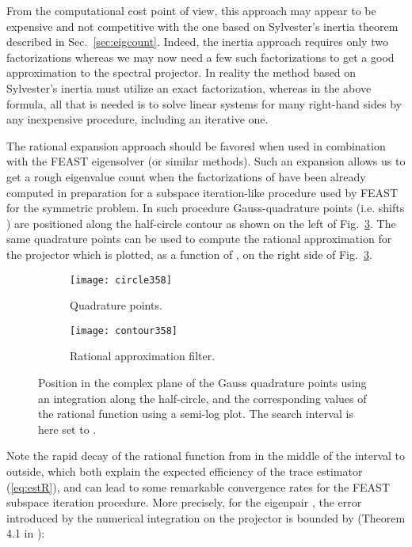 \documentclass[12pt]{article}		\usepackage{tabls,multirow}
\begin{document}
From the computational cost point of view, this approach may appear to be
expensive and not competitive with the one based on Sylvester's
inertia theorem described in Sec.~\ref{sec:eigcount}. Indeed, the
inertia approach requires only two factorizations whereas we may now
need a few such factorizations to get a good approximation to the
spectral projector. In reality the method based on Sylvester's
inertia must utilize an exact factorization, whereas in the above
formula, all that is needed is to solve linear systems  for many right-hand sides  by any inexpensive procedure,
including an iterative one. 
 
The rational expansion approach should be favored when used in
combination with the FEAST eigensolver
\cite{FEAST,FEASTsolver,FEASTdoc} (or similar methods). Such an
expansion allows us to get a rough eigenvalue count when the
factorizations of  have been already computed in
preparation for a subspace iteration-like procedure used by FEAST for
the symmetric problem. In such procedure Gauss-quadrature points
(i.e. shifts ) are positioned along the half-circle contour as
shown on the left of Fig.~\ref{fig:gauss}. The same quadrature
points can be used to compute the rational approximation for the
projector  which is plotted, as a function of ,
on the right side of Fig.~\ref{fig:gauss}.
\begin{figure}[hbt]
\centering
  \begin{subfigure}[b]{0.495\textwidth}
                \centering
                \texttt{[image: circle358]}
                \caption{Quadrature points.}
                \label{fig:quadnod}
  \end{subfigure}
  \begin{subfigure}[b]{0.495\textwidth}
                \centering
                \texttt{[image: contour358]}
                \caption{Rational approximation filter.}
                \label{fig:rafil}
  \end{subfigure}
  \caption{Position in the complex plane of the  Gauss quadrature
    points using an integration along the half-circle, and the
    corresponding values of the rational function
     using a semi-log plot. The search interval
    is here set to .}
\label{fig:gauss}
\end{figure} 
Note the rapid decay of the rational function from  in the
middle of the interval  to  outside, which both
explain the expected efficiency of the trace estimator
(\ref{eq:estR}), and can lead to some remarkable convergence rates for
the FEAST subspace iteration procedure.  More precisely, for the
eigenpair , the error introduced by the numerical
integration on the projector is bounded by (Theorem 4.1 in
\cite{Tang13}):
\end{document}
